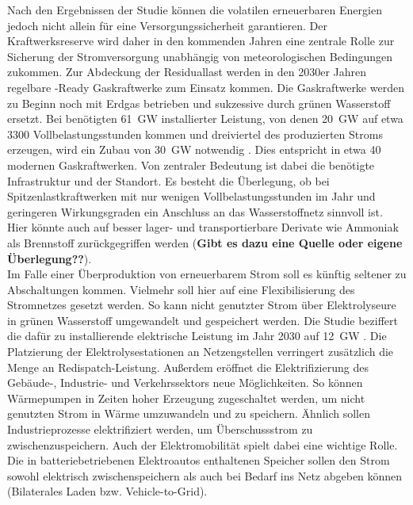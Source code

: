 		Nach den Ergebnissen der Studie können die volatilen erneuerbaren Energien jedoch nicht allein für eine Versorgungssicherheit garantieren. 
		Der Kraftwerksreserve wird daher in den kommenden Jahren eine zentrale Rolle zur Sicherung der Stromversorgung unabhängig von meteorologischen Bedingungen zukommen. 
		Zur Abdeckung der Residuallast werden in den 2030er Jahren regelbare \Htwo-Ready Gaskraftwerke zum Einsatz kommen. 		 
		Die Gaskraftwerke werden zu Beginn noch mit Erdgas betrieben und sukzessive durch grünen Wasserstoff ersetzt. 
		Bei benötigten \SI{61}{\giga\watt} installierter Leistung, von denen \SI{20}{\giga\watt} auf etwa 3300 Vollbelastungsstunden kommen und dreiviertel des produzierten Stroms erzeugen, wird ein Zubau von \SI{30}{\giga\watt} notwendig \cite[S.9]{Agora_KlimaneutralesStromsystem}.  
		Dies entspricht in etwa 40 modernen Gaskraftwerken. 
		Von zentraler Bedeutung ist dabei die benötigte Infrastruktur und der Standort. 
		Es besteht die Überlegung, ob bei Spitzenlastkraftwerken mit nur wenigen Vollbelastungsstunden im Jahr und geringeren Wirkungsgraden ein Anschluss an das Wasserstoffnetz sinnvoll ist.
		Hier könnte auch auf besser lager- und transportierbare Derivate wie Ammoniak als Brennstoff zurückgegriffen werden (\textbf{Gibt es dazu eine Quelle oder eigene Überlegung??}). \\
		
		
		Im Falle einer Überproduktion von erneuerbarem Strom soll es künftig seltener zu Abschaltungen kommen. 
		Vielmehr soll hier auf eine Flexibilisierung des Stromnetzes gesetzt werden.
		So kann nicht genutzter Strom über Elektrolyseure in grünen Wasserstoff umgewandelt und gespeichert werden. 
		Die Studie beziffert die dafür zu installierende elektrische Leistung im Jahr 2030 auf \SI{12}{\giga\watt} \cite[S.11]{Agora_KlimaneutralesStromsystem}.
		Die Platzierung der Elektrolysestationen an Netzengstellen verringert zusätzlich die Menge an Redispatch-Leistung. 
		Außerdem eröffnet die Elektrifizierung des Gebäude-, Industrie- und Verkehrssektors neue Möglichkeiten. 
		So können Wärmepumpen in Zeiten hoher Erzeugung zugeschaltet werden, um nicht genutzten Strom in Wärme umzuwandeln und zu speichern. 
		Ähnlich sollen Industrieprozesse elektrifiziert werden, um Überschussstrom zu zwischenzuspeichern. 
		Auch der Elektromobilität spielt dabei eine wichtige Rolle. 
		Die in batteriebetriebenen Elektroautos enthaltenen Speicher sollen den Strom sowohl elektrisch zwischenspeichern als auch bei Bedarf ins Netz abgeben können (Bilaterales Laden bzw. Vehicle-to-Grid). 
		

